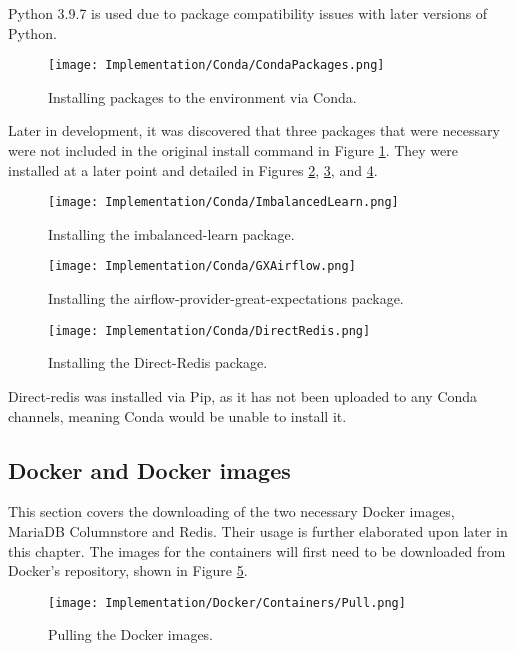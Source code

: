 \para Python 3.9.7 is used due to package compatibility issues with later versions of Python.

\begin{figure}[H]
    \centering
    \texttt{[image: Implementation/Conda/CondaPackages.png]}
    \caption{Installing packages to the environment via Conda.}
    \label{fig:CondaPackages}
\end{figure}

\para Later in development, it was discovered that three packages that were necessary were not included 
in the original install command in Figure \ref{fig:CondaPackages}. They were installed at a later point and 
detailed in Figures \ref{fig:imbLearnInstall}, \ref{fig:AirflowGXInstall}, and \ref{fig:directRedisInstall}.

\begin{figure}[H]
    \centering
    \texttt{[image: Implementation/Conda/ImbalancedLearn.png]}
    \caption{Installing the imbalanced-learn package.}
    \label{fig:imbLearnInstall}
\end{figure}

\begin{figure}[H]
    \centering
    \texttt{[image: Implementation/Conda/GXAirflow.png]}
    \caption{Installing the airflow-provider-great-expectations package.}
    \label{fig:AirflowGXInstall}
\end{figure}

\begin{figure}[H]
    \centering
    \texttt{[image: Implementation/Conda/DirectRedis.png]}
    \caption{Installing the Direct-Redis package.}
    \label{fig:directRedisInstall}
\end{figure}

\para Direct-redis was installed via Pip, as it has not been uploaded to any Conda
channels, meaning Conda would be unable to install it.

\subsection{Docker and Docker images}
This section covers the downloading of the two necessary Docker images, MariaDB Columnstore and Redis. 
Their usage is further elaborated upon later in this chapter. The images for the containers will first need to be
downloaded from Docker's repository, shown in Figure \ref{fig:DockerPull}.

\begin{figure}[H]
    \centering
    \texttt{[image: Implementation/Docker/Containers/Pull.png]}
    \caption{Pulling the Docker images.}
    \label{fig:DockerPull}
\end{figure}


